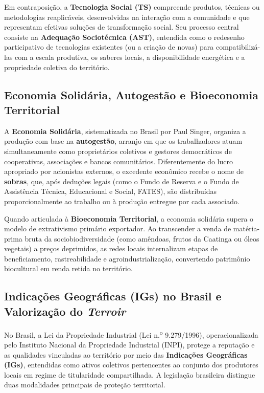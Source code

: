 Em contraposição, a \textbf{Tecnologia Social (TS)} compreende produtos, técnicas ou metodologias reaplicáveis, desenvolvidas na interação com a comunidade e que representam efetivas soluções de transformação social. Seu processo central consiste na \textbf{Adequação Sociotécnica (AST)}, entendida como o redesenho participativo de tecnologias existentes (ou a criação de novas) para compatibilizá-las com a escala produtiva, os saberes locais, a disponibilidade energética e a propriedade coletiva do território.

\subsection{Economia Solidária, Autogestão e Bioeconomia Territorial}

A \textbf{Economia Solidária}, sistematizada no Brasil por Paul Singer, organiza a produção com base na \textbf{autogestão}, arranjo em que os trabalhadores atuam simultaneamente como proprietários coletivos e gestores democráticos de cooperativas, associações e bancos comunitários. Diferentemente do lucro apropriado por acionistas externos, o excedente econômico recebe o nome de \textbf{sobras}, que, após deduções legais (como o Fundo de Reserva e o Fundo de Assistência Técnica, Educacional e Social, FATES), são distribuídas proporcionalmente ao trabalho ou à produção entregue por cada associado.

Quando articulada à \textbf{Bioeconomia Territorial}, a economia solidária supera o modelo de extrativismo primário exportador. Ao transcender a venda de matéria-prima bruta da sociobiodiversidade (como amêndoas, frutos da Caatinga ou óleos vegetais) a preços deprimidos, as redes locais internalizam etapas de beneficiamento, rastreabilidade e agroindustrialização, convertendo patrimônio biocultural em renda retida no território.

\subsection{Indicações Geográficas (IGs) no Brasil e Valorização do \textit{Terroir}}

No Brasil, a Lei da Propriedade Industrial (Lei n.\textsuperscript{o} 9.279/1996), operacionalizada pelo Instituto Nacional da Propriedade Industrial (INPI), protege a reputação e as qualidades vinculadas ao território por meio das \textbf{Indicações Geográficas (IGs)}, entendidas como ativos coletivos pertencentes ao conjunto dos produtores locais em regime de titularidade compartilhada. A legislação brasileira distingue duas modalidades principais de proteção territorial.

